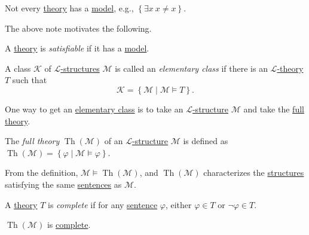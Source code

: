 \begin{note}
	Not every \hyperref[def:theory]{theory} has a \hyperref[def:model]{model}, e.g., \(\left\{ \exists x\ x \neq x \right\} \).
\end{note}

The above note motivates the following.

\begin{definition}[Satisfiable]\label{def:satisfiable}
	A \hyperref[def:theory]{theory} is \emph{satisfiable} if it has a \hyperref[def:model]{model}.
\end{definition}

\begin{definition}\label{def:elementary-class}
	A class \(\mathcal{K} \) of \hyperref[def:structure]{\(\mathcal{L} \)-structures} \(\mathcal{M} \) is called an \emph{elementary class} if there is an \hyperref[def:theory]{\(\mathcal{L} \)-theory} \(T\) such that
	\[
		\mathcal{K} = \left\{ \mathcal{M} \mid \mathcal{M} \models T \right\}.
	\]
\end{definition}

One way to get an \hyperref[def:elementary-class]{elementary class} is to take an \hyperref[def:structure]{\(\mathcal{L} \)-structure} \(\mathcal{M} \) and take the \hyperref[def:full-theory]{full theory}.

\begin{definition}\label{def:full-theory}
	The \emph{full theory} \(\mathop{\mathrm{Th}}(\mathcal{M} ) \) of an \hyperref[def:structure]{\(\mathcal{L} \)-structure} \(\mathcal{M} \) is defined as \(\mathop{\mathrm{Th}}(\mathcal{M} ) = \left\{ \varphi \mid \mathcal{M} \models \varphi  \right\}\).
\end{definition}

From the definition, \(\mathcal{M} \models \mathop{\mathrm{Th}}(\mathcal{M} ) \), and \(\mathop{\mathrm{Th}}(\mathcal{M} ) \) characterizes the \hyperref[def:structure]{structures} satisfying the same \hyperref[def:sentence]{sentences} as \(\mathcal{M} \).

\begin{definition}[Complete]\label{def:theory-complete}
	A \hyperref[def:theory]{theory} \(T\) is \emph{complete} if for any \hyperref[def:sentence]{sentence} \(\varphi \), either \(\varphi \in T\) or \(\lnot \varphi \in T\).
\end{definition}

\begin{remark}
	\(\mathop{\mathrm{Th}}(\mathcal{M} ) \) is \hyperref[def:theory-complete]{complete}.
\end{remark}

